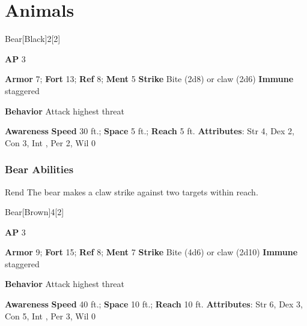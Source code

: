\section{Animals}
\begin{monsection}{Bear}[Black]{2}[2]
\vspace{-1em}\vspace{-1em}
\begin{spellcontent}
\begin{spelltargetinginfo}
{\textbf{AP} 3}

\pari \textbf{Armor} 7;
\textbf{Fort} 13;
\textbf{Ref} 8;
\textbf{Ment} 5
\pari \textbf{Strike} Bite  (2d8) or claw  (2d6)
\pari \textbf{Immune} staggered


\pari \textbf{Behavior} Attack highest threat
\end{spelltargetinginfo}
\end{spellcontent}

\begin{monsterfooter}
\pari \textbf{Awareness} 
\pari \textbf{Speed} 30 ft.;
\textbf{Space} 5 ft.;
\textbf{Reach} 5 ft.
\pari \textbf{Attributes}:
Str 4,
Dex 2,
Con 3,
Int ,
Per 2,
Wil 0
\end{monsterfooter}
\end{monsection}


\subsubsection{Bear Abilities}

\begin{ability}{Rend}
The bear makes a claw strike against two targets within reach.
\end{ability}

\begin{monsection}{Bear}[Brown]{4}[2]
\vspace{-1em}\vspace{-1em}
\begin{spellcontent}
\begin{spelltargetinginfo}
{\textbf{AP} 3}

\pari \textbf{Armor} 9;
\textbf{Fort} 15;
\textbf{Ref} 8;
\textbf{Ment} 7
\pari \textbf{Strike} Bite  (4d6) or claw  (2d10)
\pari \textbf{Immune} staggered


\pari \textbf{Behavior} Attack highest threat
\end{spelltargetinginfo}
\end{spellcontent}

\begin{monsterfooter}
\pari \textbf{Awareness} 
\pari \textbf{Speed} 40 ft.;
\textbf{Space} 10 ft.;
\textbf{Reach} 10 ft.
\pari \textbf{Attributes}:
Str 6,
Dex 3,
Con 5,
Int ,
Per 3,
Wil 0
\end{monsterfooter}
\end{monsection}


